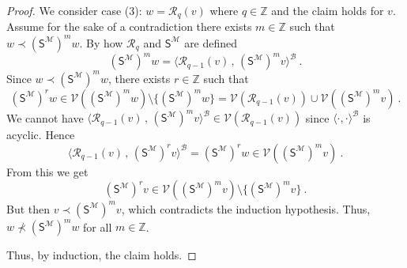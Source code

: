 \documentclass[10pt,a4paper, openany,  oldfontcommands]{memoir}
\newtheorem{open problem} [theorem] {Open Problem}
\newtheorem{open question} [theorem] {Open Question}
\renewcommand{\mathrm}{\mathsf}
\begin{document}
\begin{proof}
 We consider   case  (3):     $  w  =  \mathcal{R}_q  \left(  v  \right)  $   where   $  q  \in  \mathbb{Z}   $  and the claim holds for  $  v $. 
 Assume for the sake of a contradiction there exists  $  m  \in  \mathbb{Z}  $  such that     $  w  \prec      \left(  \mathrm{S}^{  \mathcal{M} }  \right)^m  w   $.
 By how  $  \mathcal{R}_q  $  and    $  \mathrm{S}^{  \mathcal{M} }  $     are   defined 
 \[
  \left(  \mathrm{S}^{  \mathcal{M} }  \right)^m  w
  = 
    \langle    \mathcal{R}_{q-1}  \left(  v  \right)    \,  ,   \,     \left(  \mathrm{S}^{  \mathcal{M} }  \right)^m  v  \rangle^{  \mathcal{B} }  
    \         .
 \] 
  Since   $  w  \prec      \left(  \mathrm{S}^{  \mathcal{M} }  \right)^m  w   $,    there exists    $  r  \in  \mathbb{Z}  $  
    such that  
\[
 \left(  \mathrm{S}^{  \mathcal{M} }  \right)^r  w  \in     \mathcal{V}  \left(   \left(  \mathrm{S}^{  \mathcal{M} }  \right)^m  w    \right)   \setminus  \lbrace   \left(    \mathrm{S}^{  \mathcal{M} }  \right)^m  w   \rbrace 
   =  
 \mathcal{V}  \left(   \mathcal{R}_{q-1}  \left(  v  \right)       \right)   \cup    \mathcal{V}  \left(   \left(  \mathrm{S}^{  \mathcal{M} }  \right)^m  v    \right) 
\      .
\]
We cannot have   
$      \langle    \mathcal{R}_{q-1}  \left(  v  \right)    \,  ,   \,     \left(  \mathrm{S}^{  \mathcal{M} }  \right)^m  v  \rangle^{  \mathcal{B} }  
  \in 
    \mathcal{V}  \left(   \mathcal{R}_{q-1}  \left(  v  \right)       \right)   $
since    $  \langle  \cdot  ,  \cdot  \rangle^{  \mathcal{B}  }  $  is  acyclic. 
Hence 
\[  
    \langle    \mathcal{R}_{q-1}  \left(  v  \right)    \,  ,   \,     \left(  \mathrm{S}^{  \mathcal{M} }  \right)^r  v  \rangle^{  \mathcal{B} }  
=
  \left(  \mathrm{S}^{  \mathcal{M} }  \right)^r  w 
   \in 
          \mathcal{V}  \left(   \left(  \mathrm{S}^{  \mathcal{M} }  \right)^m  v    \right)   
  \       .
  \]
From this we get 
\[
   \left(  \mathrm{S}^{  \mathcal{M} }  \right)^r  v  \in  \mathcal{V}   \left(   \left(  \mathrm{S}^{  \mathcal{M} }  \right)^m  v    \right)  
\setminus   \lbrace   \left(  \mathrm{S}^{  \mathcal{M} }  \right)^m  v    \rbrace   
\     .
\]
But then  $  v  \prec   \left(  \mathrm{S}^{  \mathcal{M} }  \right)^m  v    $,  
which contradicts  the induction hypothesis. 
Thus,    $  w    \not\prec      \left(  \mathrm{S}^{  \mathcal{M} }  \right)^m  w   $  for all  $  m  \in  \mathbb{Z}  $.





Thus, by induction, the claim holds. 









\end{proof}
\end{document}

